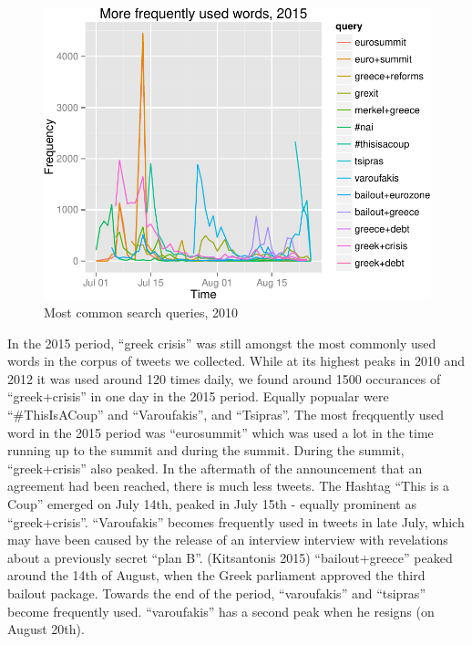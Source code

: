 \documentclass[]{article}
\begin{document}
\begin{figure}

{\centering \includegraphics{fin_paper_files/figure-latex/unnamed-chunk-10-1} 

}

\caption{Most common search queries, 2010}\label{fig:unnamed-chunk-10}
\end{figure}

In the 2015 period, ``greek crisis'' was still amongst the most commonly
used words in the corpus of tweets we collected. While at its highest
peaks in 2010 and 2012 it was used around 120 times daily, we found
around 1500 occurances of ``greek+crisis'' in one day in the 2015
period. Equally popualar were ``\#ThisIsACoup'' and ``Varoufakis'', and
``Tsipras''. The most freqquently used word in the 2015 period was
``eurosummit'' which was used a lot in the time running up to the summit
and during the summit. During the summit, ``greek+crisis'' also peaked.
In the aftermath of the announcement that an agreement had been reached,
there is much less tweets. The Hashtag ``This is a Coup'' emerged on
July 14th, peaked in July 15th - equally prominent as ``greek+crisis''.
``Varoufakis'' becomes frequently used in tweets in late July, which may
have been caused by the release of an interview interview with
revelations about a previously secret ``plan B''. (Kitsantonis 2015)
``bailout+greece'' peaked around the 14th of August, when the Greek
parliament approved the third bailout package. Towards the end of the
period, ``varoufakis'' and ``tsipras'' become frequently used.
``varoufakis'' has a second peak when he resigns (on August 20th).
\end{document}
